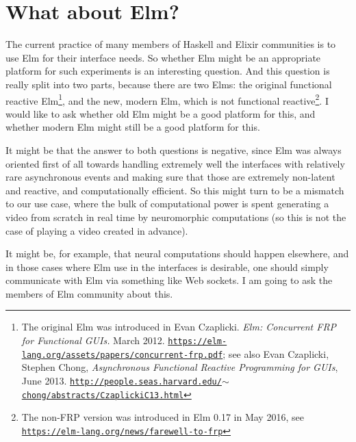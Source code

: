 \documentclass{article}
\begin{document}
\section{What about Elm?}

The current practice of many members of Haskell and Elixir communities is to use Elm for their interface needs.
So whether Elm might be an appropriate platform for such experiments is an interesting question. And this question
is really split into two parts, because there are two Elms: the original functional reactive Elm\footnote{The original Elm
was introduced in Evan Czaplicki. {\em Elm: Concurrent FRP for Functional GUIs.} March 2012.
\href{https://elm-lang.org/assets/papers/concurrent-frp.pdf}{\tt https://elm-lang.org/assets/papers/concurrent-frp.pdf};
see also Evan Czaplicki, Stephen Chong, {\em Asynchronous Functional Reactive Programming for GUIs}, June 2013.
\href{http://people.seas.harvard.edu/~chong/abstracts/CzaplickiC13.html}{\tt http://people.seas.harvard.edu/$\sim$chong/abstracts/CzaplickiC13.html}}, and the new, modern
Elm, which is not functional reactive\footnote{The non-FRP version was introduced in Elm 0.17 in May 2016, see\\
\href{https://elm-lang.org/news/farewell-to-frp}{\tt https://elm-lang.org/news/farewell-to-frp}}. 
I would like to ask whether old Elm might be a good platform for this, and whether
modern Elm might still be a good platform for this.

It might be that the answer to both questions is negative, since Elm was always oriented first of all towards handling extremely well the
interfaces with relatively rare asynchronous events and making sure that those are extremely non-latent and reactive, and
computationally efficient. So this might turn to be a mismatch to our use case, where the bulk of computational power is
spent generating a video from scratch in real time by neuromorphic computations (so this is not the case of playing a video created in advance).

It might be, for example, that neural computations should happen elsewhere, and in those cases where Elm use in the interfaces
is desirable, one should simply communicate with Elm via something like Web sockets. I am going to ask the members of Elm community
about this.
\end{document}
